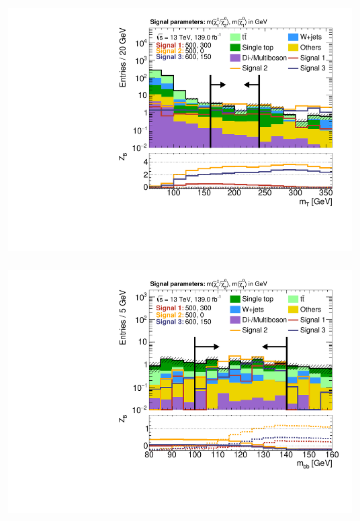 \begin{figure}
\begin{subfigure}[b]{0.45\linewidth}
		\centering\includegraphics[width=\textwidth]{n1_SRMM_mct_bins/mt_both.pdf}
		\vspace{-2em}
		\caption{\label{fig:Wh_reopt_second_round_n1_srmm_mt}}
	\end{subfigure}%
	\begin{subfigure}[b]{0.45\linewidth}
		\centering\includegraphics[width=\textwidth]{n1_SRMM_mct_bins/mbb_both.pdf}
		\vspace{-2em}
		\caption{\label{fig:Wh_reopt_second_round_n1_srmm_mbb}}
	\end{subfigure}
	\par\medskip

\end{figure}
